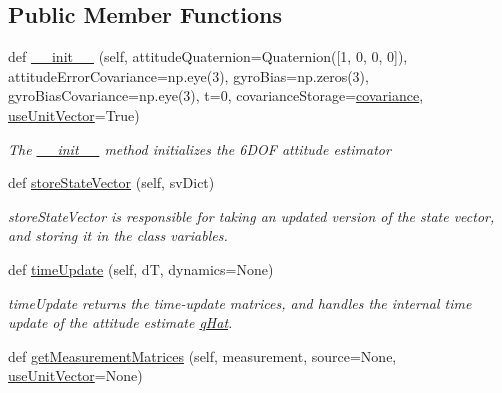 \subsection*{Public Member Functions}
\begin{DoxyCompactItemize}
\item 
def \hyperlink{classmodest_1_1substates_1_1attitude_1_1Attitude_af09cd863335efb09a7a78bafd7b52ff6}{\+\_\+\+\_\+init\+\_\+\+\_\+} (self, attitude\+Quaternion=Quaternion(\mbox{[}1, 0, 0, 0\mbox{]}), attitude\+Error\+Covariance=np.\+eye(3), gyro\+Bias=np.\+zeros(3), gyro\+Bias\+Covariance=np.\+eye(3), t=0, covariance\+Storage=\textquotesingle{}\hyperlink{classmodest_1_1substates_1_1substate_1_1SubState_a6e308aadd13962e476d2892ec728e3a5}{covariance}\textquotesingle{}, \hyperlink{classmodest_1_1substates_1_1attitude_1_1Attitude_a528738f0ad3971fd2476007cc5ef0e1e}{use\+Unit\+Vector}=True)
\begin{DoxyCompactList}\small\item\em The \hyperlink{classmodest_1_1substates_1_1attitude_1_1Attitude_af09cd863335efb09a7a78bafd7b52ff6}{\+\_\+\+\_\+init\+\_\+\+\_\+} method initializes the 6\+D\+OF attitude estimator \end{DoxyCompactList}\item 
def \hyperlink{classmodest_1_1substates_1_1attitude_1_1Attitude_a7ed2c772a331dadab761afd11d980c9e}{store\+State\+Vector} (self, sv\+Dict)
\begin{DoxyCompactList}\small\item\em store\+State\+Vector is responsible for taking an updated version of the state vector, and storing it in the class variables. \end{DoxyCompactList}\item 
def \hyperlink{classmodest_1_1substates_1_1attitude_1_1Attitude_a07af5c587e6576e3421197a20880222e}{time\+Update} (self, dT, dynamics=None)
\begin{DoxyCompactList}\small\item\em time\+Update returns the time-\/update matrices, and handles the internal time update of the attitude estimate \hyperlink{classmodest_1_1substates_1_1attitude_1_1Attitude_a22a550534d908153baef2e52f7142c5e}{q\+Hat}. \end{DoxyCompactList}\item 
def \hyperlink{classmodest_1_1substates_1_1attitude_1_1Attitude_a62e542f722f0d5b50694ca3366ab81f0}{get\+Measurement\+Matrices} (self, measurement, source=None, \hyperlink{classmodest_1_1substates_1_1attitude_1_1Attitude_a528738f0ad3971fd2476007cc5ef0e1e}{use\+Unit\+Vector}=None)

\end{DoxyCompactItemize}

